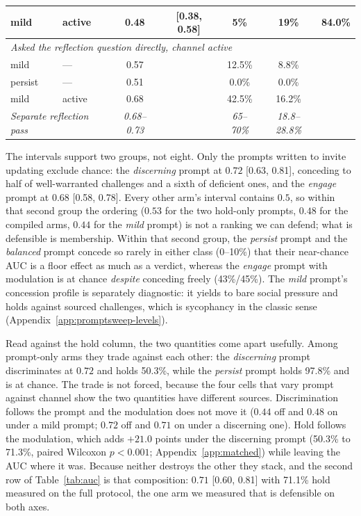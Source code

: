 \begin{table}[tb]
\begin{tabular}{llccccc}
\quad mild & active & 0.48 & [0.38, 0.58] & 5\% & 19\% & 84.0\% \\
\midrule
\multicolumn{7}{l}{\emph{Asked the reflection question directly, channel active}} \\
\quad mild & --- & 0.57 & & 12.5\% & 8.8\% & \\
\quad persist & --- & 0.51 & & 0.0\% & 0.0\% & \\
\quad mild & active & 0.68 & & 42.5\% & 16.2\% & \\
\midrule
\multicolumn{2}{l}{\emph{Separate reflection pass}} & \emph{0.68--0.73} & & \emph{65--70\%} & \emph{18.8--28.8\%} & \\
\bottomrule
\end{tabular}
\end{table}

The intervals support two groups, not eight. Only the prompts written to invite updating
exclude chance: the \emph{discerning} prompt at \(0.72\) [0.63, 0.81], conceding to half of
well-warranted challenges and a sixth of deficient ones, and the \emph{engage} prompt at \(0.68\)
[0.58, 0.78]. Every other arm's interval contains \(0.5\), so within that second group the
ordering (\(0.53\) for the two hold-only prompts, \(0.48\) for the compiled arms,
\(0.44\) for the \emph{mild} prompt) is not a ranking we can defend; what is defensible is
membership. Within that second group, the \emph{persist} prompt and the \emph{balanced} prompt concede so
rarely in either class (0--10\%) that their near-chance AUC is a floor effect as much as a
verdict, whereas the \emph{engage} prompt with modulation is at chance \emph{despite} conceding freely
(43\%/45\%). The \emph{mild} prompt's concession profile is separately diagnostic: it yields to
bare social pressure and holds against sourced challenges, which is sycophancy in the classic
sense (Appendix~\ref{app:promptsweep-levels}).

Read against the hold column, the two quantities come apart usefully. Among prompt-only arms
they trade against each other: the \emph{discerning} prompt discriminates at \(0.72\) and holds
50.3\%, while the \emph{persist} prompt holds 97.8\% and is at chance. The trade is not forced,
because the four cells that vary prompt against channel show the two quantities have different
sources. Discrimination follows the prompt and the modulation does not move it (\(0.44\) off
and \(0.48\) on under a mild prompt; \(0.72\) off and \(0.71\) on under a discerning
one). Hold follows the modulation, which adds \(+21.0\) points under the discerning prompt
(50.3\% to 71.3\%, paired Wilcoxon \(p<0.001\); Appendix~\ref{app:matched}) while leaving
the AUC where it was. Because neither destroys the other they stack, and the second row of Table~\ref{tab:auc} is that composition: \(0.71\) [0.60, 0.81] with
71.1\% hold measured on the full protocol, the one arm we measured that is defensible on both
axes.

